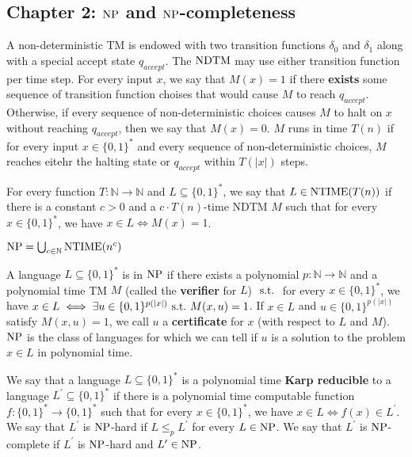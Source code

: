 \subsection*{Chapter 2: $\NP$ and $\NP$-completeness}
\begin{note}
  A non-deterministic TM is endowed with two transition functions
  $\delta_0$ and $\delta_1$ along with a special accept state $q_{accept}$.
  The $\mathrm{NDTM}$ may use either transition function per time step.
  For every input $x$, we say that $M(x) = 1$ if there \textbf{exists}
  some sequence of transition function choises
  that would cause $M$ to reach $q_{accept}$.
  Otherwise, if every sequence of non-deterministic choices causes $M$ to halt
  on $x$ without reaching $q_{accept}$, then we say that $M(x) = 0$.
  $M$ runs in time $T(n)$ if for every input $x \in \{0, 1\}^\ast$ and every
  sequence of non-deterministic choices, $M$ reaches eitehr the halting state
  or $q_{accept}$ within $T(|x|)$ steps.
\end{note}

\begin{note}[$\NTIME$]
  For every function $T : \mathbb{N} \to \mathbb{N}$ and
  $L \subseteq \{0, 1\}^\ast$, we say that $L \in \mathrm{NTIME}(T(n))$ if there is
  a constant $c > 0$ and a $c \cdot T(n)$-time NDTM $M$ such that for
  every $x \in \{0, 1\}^\ast$, we have $x \in L \iff M(x) = 1$.
\end{note}

\begin{note}[$\NP$]
  $\mathrm{NP} = \bigcup_{c \in \mathbb{N}} \mathrm{NTIME}(n^c)$
\end{note}

\begin{note}[]
  A language $L \subseteq \{0, 1\}^\ast$ is in $\NP$ if there exists a
  polynomial $p : \mathbb{N} \to \mathbb{N}$ and a polynomial time TM $M$
  (called the \textbf{verifier} for $L$) $\mathrm{\ s.t.\ }$ for every
  $x \in \{0, 1\}^\ast$, we have
  $x \in L \iff \exists u \in \{0, 1\}^{p(|x|)} \mathrm{\ s.t.\ } M(x, u) = 1$.
  If $x \in L$ and $u \in \{0, 1\}^{p(|x|)}$ satisfy $M(x, u) = 1$,
  we call $u$ a \textbf{certificate} for $x$ (with respect to $L$ and $M$).
  $\NP$ is the class of languages for which we can tell if
  $u$ is a solution to the problem $x \in L$ in polynomial time.
\end{note}

\begin{note}
  We say that a language $L \subseteq \{0, 1\}^\ast$ is a polynomial time
  \textbf{Karp reducible} to a language $L^\prime \subseteq \{0, 1\}^\ast$ if
  there is a polynomial time computable function
  $f : \{0, 1\}^\ast \to \{0, 1\}^\ast$ such that for
  every $x \in \{0, 1\}^\ast$, we have $x \in L \iff f(x) \in L^\prime$.
  We say that $L^\prime$ is $\NP$-hard if $L \leq_p L^\prime$ for every
  $L \in \mathrm{NP}$.
  We say that $L^\prime$ is $\NP$-complete if $L^\prime$ is $\NP$-hard and
  $L^\prime \in \mathrm{NP}$.
\end{note}

